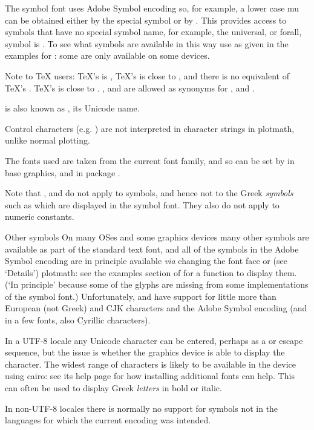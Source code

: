 \begin{Details}
The symbol font uses Adobe Symbol encoding so, for example, a lower
case mu can be obtained either by the special symbol  or by
.  This provides access to symbols that have no
special symbol name, for example, the universal, or forall, symbol is
.  To see what symbols are available in this way
use  as given in the examples for
: some are only available on some devices.

Note to TeX users: TeX's  is , TeX's
 is close to , and there is no
equivalent of TeX's .  TeX's  is close to
.  ,  and  are
allowed as synonyms for ,  and .

 is also known as , its Unicode name.

Control characters (e.g. ) are not interpreted in character
strings in plotmath, unlike normal plotting.

The fonts used are taken from the current font family, and so can be
set by  in base graphics, and
 in package .

Note that ,  and  do not
apply to symbols, and hence not to the Greek \emph{symbols} such as
 which are displayed in the symbol font.  They also do not
apply to numeric constants.
\end{Details}
%
\begin{Section}{Other symbols}
On many OSes and some graphics devices many other symbols are
available as part of the standard text font, and all of the symbols in
the Adobe Symbol encoding are in principle available \emph{via}
changing the font face or (see `Details') plotmath: see the
examples section of  for a function to display
them.  (`In principle' because some of the glyphs are missing
from some implementations of the symbol font.)  Unfortunately,
 and  have support for little
more than European (not Greek) and CJK characters and the Adobe Symbol
encoding (and in a few fonts, also Cyrillic characters).

In a UTF-8 locale any Unicode character can be entered, perhaps as a
 or  escape sequence, but the issue is
whether the graphics device is able to display the character.  The
widest range of characters is likely to be available in the
 device using cairo: see its help page for how
installing additional fonts can help.  This can often be used to
display Greek \emph{letters} in bold or italic.

In non-UTF-8 locales there is normally no support for symbols not in
the languages for which the current encoding was intended.
\end{Section}
